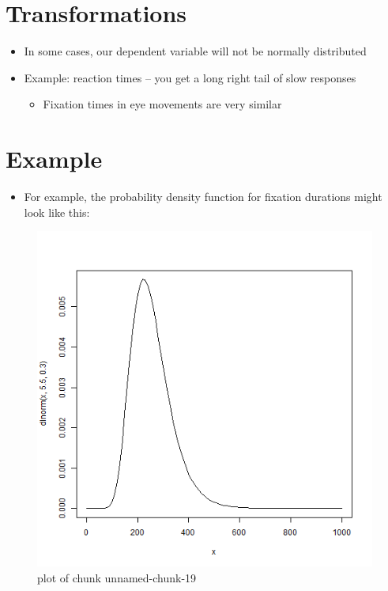 \documentclass[]{article}
\begin{document}
\section{Transformations}\label{transformations}

\begin{itemize}
\itemsep1pt\parskip0pt
\item
  In some cases, our dependent variable will not be normally distributed
\item
  Example: reaction times -- you get a long right tail of slow responses

  \begin{itemize}
  \itemsep1pt\parskip0pt
  \item
    Fixation times in eye movements are very similar
  \end{itemize}
\end{itemize}

\section{Example}\label{example-3}

\begin{itemize}
\itemsep1pt\parskip0pt
\item
  For example, the probability density function for fixation durations
  might look like this:
\end{itemize}

\begin{figure}[htbp]
\centering
\includegraphics{Class6-figure/unnamed-chunk-19.png}
\caption{plot of chunk unnamed-chunk-19}
\end{figure}
\end{document}
